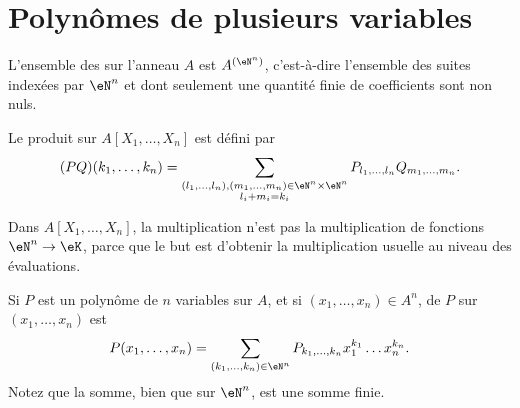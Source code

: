 \section{Polynômes de plusieurs variables}

\begin{definition}      \label{DEFooZNHOooCruuwI}
	L'ensemble des  sur l'anneau \( A\) est \( A^{(\eN^n)}\), c'est-à-dire l'ensemble des suites indexées par \( \eN^n\) et dont seulement une quantité finie de coefficients sont non nuls.

	Le produit sur \( A[X_1,\ldots, X_n]\) est défini par
	\begin{equation}
		(PQ)(k_1,\ldots, k_n)=\sum_{\substack{ (l_1,\ldots, l_n),(m_1,\ldots, m_n)\in \eN^n\times \eN^n   \\l_i+m_i=k_i}}P_{l_1,\ldots, l_n}Q_{m_1,\ldots, m_n}.
	\end{equation}
\end{definition}

\begin{normaltext}
	Dans \( A[X_1,\ldots, X_n]\), la multiplication n'est pas la multiplication de fonctions \( \eN^n\to \eK\), parce que le but est d'obtenir la multiplication usuelle au niveau des évaluations.
\end{normaltext}

\begin{definition}		\label{DEFooFDBAooHvfMue}
	Si \( P\) est un polynôme de \( n\) variables sur \( A\), et si \( (x_1,\ldots, x_n)\in A^n\),  de \( P\) sur \( (x_1,\ldots, x_n)\) est
	\begin{equation}
		P(x_1,\ldots, x_n)=\sum_{(k_1,\ldots, k_n)\in \eN^n}P_{k_1,\ldots, k_n}x_1^{k_1}\ldots x_n^{k_n}.
	\end{equation}
	Notez que la somme, bien que sur \( \eN^n\), est une somme finie.
\end{definition}

